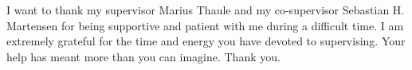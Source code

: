 I want to thank my supervisor Marius Thaule and my co-supervisor Sebastian H. Martensen for being supportive and patient with me during a difficult time. I am extremely grateful for the time and energy you have devoted to supervising. Your help has meant more than you can imagine. Thank you.